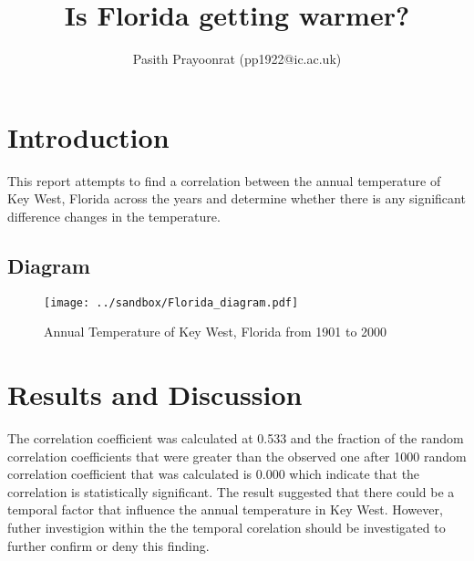\documentclass[12pt]{article}
\title{Is Florida getting warmer?}
\author{Pasith Prayoonrat (pp1922@ic.ac.uk)}
\begin{document}
  \maketitle

\section{Introduction}
    This report attempts to find a correlation between the annual temperature of Key West, Florida across the years and determine whether there is any significant difference changes in the temperature.
\subsection*{Diagram}
\begin{figure}[H]
\centering
\texttt{[image: ../sandbox/Florida\_diagram.pdf]}
\caption{\label{fig:Florida_graph} Annual Temperature of Key West, Florida from 1901 to 2000}
\end{figure}

\section{Results and Discussion}
    The correlation coefficient was calculated at 0.533 and the fraction of the random correlation coefficients that were greater than the observed one after 1000 random correlation coefficient that was calculated is 0.000 which indicate that the correlation is statistically significant. The result suggested that there could be a temporal factor that influence the annual temperature in Key West. However, futher investigion within the the temporal corelation should be investigated to further confirm or deny this finding.
\end{document}
